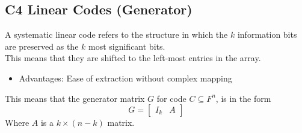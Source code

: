 \documentclass[../../main.tex]{subfiles}
\begin{document}
\subsection{C4 Linear Codes (Generator)}
\begin{definition}
    A systematic linear code refers to the structure in which the $k$ information bits are preserved as the $k$ most significant bits.\\
    
    This means that they are shifted to the left-most entries in the array.
    \begin{itemize}
        \item Advantages: Ease of extraction without complex mapping
    \end{itemize}
    This means that the generator matrix $G$ for code $C\subseteq F^n$, is in the form
    \[
    G = \begin{bmatrix}I_k& A\end{bmatrix}
    \]
    Where $A$ is a $k\times (n-k)$ matrix.
\end{definition}
\end{document}
